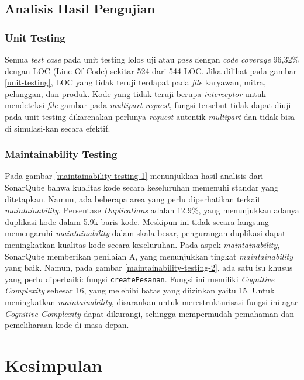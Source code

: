 \newpage

\subsection{Analisis Hasil Pengujian}
\subsubsection{Unit Testing}
Semua \textit{test case} pada unit testing lolos uji atau \textit{pass} dengan \textit{code coverage} 96,32\% dengan LOC (Line Of Code) sekitar 524 dari 544 LOC. Jika dilihat pada gambar \ref{unit-testing}, LOC yang tidak teruji terdapat pada \textit{file} karyawan, mitra, pelanggan, dan produk. Kode yang tidak teruji berupa \textit{interceptor} untuk mendeteksi \textit{file} gambar pada \textit{multipart} \textit{request}, fungsi tersebut tidak dapat diuji pada unit testing dikarenakan perlunya \textit{request} autentik \textit{multipart} dan tidak bisa di simulasi-kan secara efektif.

\subsubsection{Maintainability Testing}
Pada gambar \ref{maintainability-testing-1} menunjukkan hasil analisis dari SonarQube bahwa kualitas kode secara keseluruhan memenuhi standar yang ditetapkan. Namun, ada beberapa area yang perlu diperhatikan terkait \textit{maintainability}. Persentase \textit{Duplications} adalah 12.9\%, yang menunjukkan adanya duplikasi kode dalam 5.9k baris kode. Meskipun ini tidak secara langsung memengaruhi \textit{maintainability} dalam skala besar, pengurangan duplikasi dapat meningkatkan kualitas kode secara keseluruhan. Pada aspek \textit{maintainability}, SonarQube memberikan penilaian A, yang menunjukkan tingkat \textit{maintainability} yang baik. Namun, pada gambar \ref{maintainability-testing-2}, ada satu isu khusus yang perlu diperbaiki: fungsi \texttt{createPesanan}. Fungsi ini memiliki \textit{Cognitive Complexity} sebesar 16, yang melebihi batas yang diizinkan yaitu 15. Untuk meningkatkan \textit{maintainability}, disarankan untuk merestrukturisasi fungsi ini agar \textit{Cognitive Complexity} dapat dikurangi, sehingga mempermudah pemahaman dan pemeliharaan kode di masa depan.
\section{Kesimpulan}

